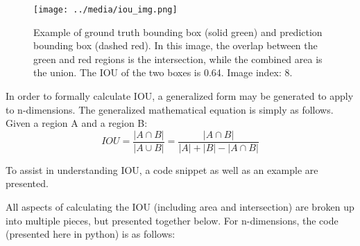 \begin{figure}[ht] %
    \texttt{[image: ../media/iou\_img.png]}
    \caption{Example of ground truth bounding box (solid green) and prediction bounding box (dashed red). In this image, the overlap between the green and red regions is the intersection, while the combined area is the union. The IOU of the two boxes is 0.64. Image index: 8.}
    \label{iou_img} %
\end{figure}

In order to formally calculate IOU, a generalized form may be generated to apply to n-dimensions. The generalized mathematical equation is simply as follows. Given a region A and a region B: 
\begin{equation}
IOU = \frac{|A\cap B|}{|A\cup B|} = \frac{|A\cap B|}{|A|+|B|- |A\cap B|}
\end{equation}

To assist in understanding IOU, a code snippet as well as an example are presented.

All aspects of calculating the IOU (including area and intersection) are broken up into multiple pieces, but presented together below. For n-dimensions, the code (presented here in python) is as follows: 


